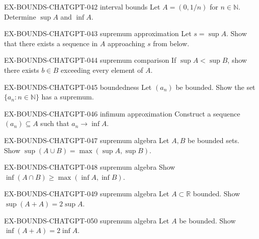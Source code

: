 \exstubgen
{EX-BOUNDS-CHATGPT-042}
{interval bounds}
{Let $A=(0,1/n)$ for $n\in\mathbb N$. Determine $\sup A$ and $\inf A$.}

\exstubgen
{EX-BOUNDS-CHATGPT-043}
{supremum approximation}
{Let $s=\sup A$. Show that there exists a sequence in $A$ approaching $s$
from below.}

\exstubgen
{EX-BOUNDS-CHATGPT-044}
{supremum comparison}
{If $\sup A < \sup B$, show there exists $b\in B$ exceeding every element of $A$.}

\exstubgen
{EX-BOUNDS-CHATGPT-045}
{boundedness}
{Let $(a_n)$ be bounded. Show the set $\{a_n:n\in\mathbb N\}$ has a supremum.}

\exstubgen
{EX-BOUNDS-CHATGPT-046}
{infimum approximation}
{Construct a sequence $(a_n)\subseteq A$ such that $a_n\to\inf A$.}

\exstubgen
{EX-BOUNDS-CHATGPT-047}
{supremum algebra}
{Let $A,B$ be bounded sets. Show $\sup(A\cup B)=\max(\sup A,\sup B)$.}

\exstubgen
{EX-BOUNDS-CHATGPT-048}
{supremum algebra}
{Show $\inf(A\cap B)\ge\max(\inf A,\inf B)$.}

\exstubgen
{EX-BOUNDS-CHATGPT-049}
{supremum algebra}
{Let $A\subset\mathbb R$ bounded. Show $\sup(A+A)=2\sup A$.}

\exstubgen
{EX-BOUNDS-CHATGPT-050}
{supremum algebra}
{Let $A$ be bounded. Show $\inf(A+A)=2\inf A$.}